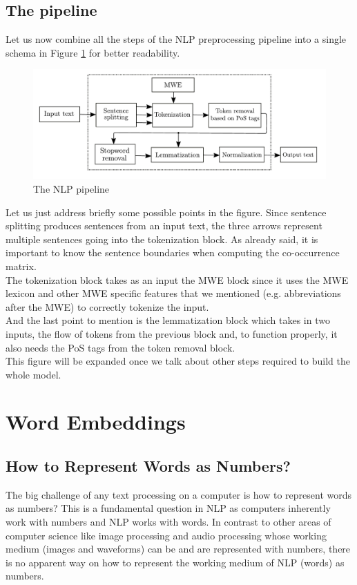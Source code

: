 \documentclass[12pt]{article}
\numberwithin{equation}{section}
\begin{document}
\begin{spacing}{1.5}
	\subsection{The pipeline}
	Let us now combine all the steps of the NLP preprocessing pipeline into a single schema in Figure \ref{NLP_pipeline_label} for better readability.
	\begin{figure}[H]
		\centering
		\hspace*{-1.0cm}
		\includegraphics[scale=0.85]{NLP_pipeline}		
		\caption{The NLP pipeline}
		\label{NLP_pipeline_label}
	\end{figure}
	Let us just address briefly some possible points in the figure. Since sentence splitting produces sentences from an input text, the three arrows represent multiple sentences going into the tokenization block. As already said, it is important to know the sentence boundaries when computing the co-occurrence matrix. \\
	The tokenization block takes as an input the MWE block since it uses the MWE lexicon and other MWE specific features that we mentioned (e.g. abbreviations after the MWE) to correctly tokenize the input. \\
	And the last point to mention is the lemmatization block which takes in two inputs, the flow of tokens from the previous block and, to function properly, it also needs the PoS tags from the token removal block. \\
	This figure will be expanded once we talk about other steps required to build the whole model. 

	
	\newpage 
	\section{Word Embeddings}
	\subsection{How to Represent Words as Numbers?}
	The big challenge of any text processing on a computer is how to represent words as numbers? This is a fundamental question in NLP as computers inherently work with numbers and NLP works with words. In contrast to other areas of computer science like image processing and audio processing whose working medium (images and waveforms) can be and are represented with numbers, there is no apparent way on how to represent the working medium of NLP (words) as numbers.
	

\end{spacing}
\end{document}

